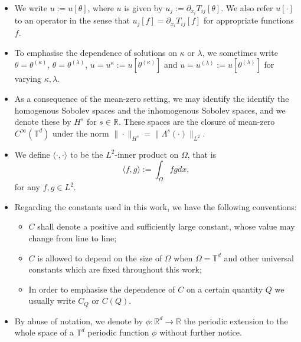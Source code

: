 \documentclass[reqno]{amsart}%
\theoremstyle{definition}
\theoremstyle{remark}
\numberwithin{equation}{section}
\newcommand{\thetakappa}{\theta^{(\kappa)}}
\newcommand{\1}{\mathbf{1}}
\newcommand{\T}{\mathbb T}
\newcommand{\R}{\mathbb R}
\numberwithin{equation}{section}
\numberwithin{theorem}{section}
\numberwithin{figure}{section}
\begin{document}
\begin{itemize}
\item We write $u:=u[\theta]$, where $u$ is given by $u_j:=\partial_{x_i} T_{ij}[\theta]$. We also refer $u[\cdot]$ to an operator in the sense that $u_j[f]=\partial_{x_i} T_{ij}[f]$ for appropriate functions $f$.
\item To emphasise the dependence of solutions on $\kappa$ or $\lambda$, we sometimes write $\theta=\thetakappa$, $\theta=\theta^{(\lambda)}$, $u=u^{\kappa}:=u[\thetakappa]$ and $u=u^{(\lambda)}:=u[\theta^{(\lambda)}]$ for varying $\kappa,\lambda$.
\item As a consequence of the mean-zero setting, we may identify the identify the homogenous Sobolev spaces and the inhomogenous Sobolev spaces, and we denote these by $H^s$ for $s\in\R$. These spaces are the closure of mean-zero $C^\infty(\T^d)$ under the norm $\|\cdot\|_{H^s}=\|\Lambda^s(\cdot)\|_{L^2}$.
\item We define $\langle\cdot,\cdot\rangle$ to be the $L^2$-inner product on $\Omega$, that is
\begin{equation*}
\langle f,g\rangle:=\int_{\Omega}fgdx,
\end{equation*}
for any $f,g\in L^2$.
\item Regarding the constants used in this work, we have the following conventions:
\begin{itemize}
\item $C$ shall denote a positive and sufficiently large constant, whose value may change from line to line; 
\item $C$ is allowed to depend on the size of $\Omega$ when $\Omega=\mathbb{T}^d$ and other universal constants which are fixed throughout this work; 
\item In order to emphasise the dependence of $C$ on a certain quantity $Q$ we usually write $C_{Q}$ or $C(Q)$.
\end{itemize}
\item By abuse of notation, we denote by $\phi:\R^d\to\R$ the periodic extension to the whole space of a
$\T^d$ periodic function $\phi$ without further notice.
\end{itemize}
\end{document}
